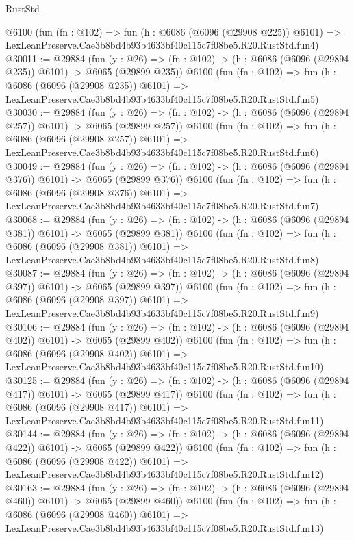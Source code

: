 \begin{lexlean}{RustStd}
\begin{coremodule}
    @6100
    (fun (fn : @102) =>
    fun (h : @6086 (@6096 (@29908 @225)) @6101) =>
    LexLeanPreserve.Cae3b8bd4b93b4633bf40c115c7f08be5.R20.RustStd.fun4)
@30011 := @29884
    (fun (y : @26) => (fn : @102) -> (h : @6086 (@6096 (@29894 @235)) @6101) -> @6065 (@29899 @235))
    @6100
    (fun (fn : @102) =>
    fun (h : @6086 (@6096 (@29908 @235)) @6101) =>
    LexLeanPreserve.Cae3b8bd4b93b4633bf40c115c7f08be5.R20.RustStd.fun5)
@30030 := @29884
    (fun (y : @26) => (fn : @102) -> (h : @6086 (@6096 (@29894 @257)) @6101) -> @6065 (@29899 @257))
    @6100
    (fun (fn : @102) =>
    fun (h : @6086 (@6096 (@29908 @257)) @6101) =>
    LexLeanPreserve.Cae3b8bd4b93b4633bf40c115c7f08be5.R20.RustStd.fun6)
@30049 := @29884
    (fun (y : @26) => (fn : @102) -> (h : @6086 (@6096 (@29894 @376)) @6101) -> @6065 (@29899 @376))
    @6100
    (fun (fn : @102) =>
    fun (h : @6086 (@6096 (@29908 @376)) @6101) =>
    LexLeanPreserve.Cae3b8bd4b93b4633bf40c115c7f08be5.R20.RustStd.fun7)
@30068 := @29884
    (fun (y : @26) => (fn : @102) -> (h : @6086 (@6096 (@29894 @381)) @6101) -> @6065 (@29899 @381))
    @6100
    (fun (fn : @102) =>
    fun (h : @6086 (@6096 (@29908 @381)) @6101) =>
    LexLeanPreserve.Cae3b8bd4b93b4633bf40c115c7f08be5.R20.RustStd.fun8)
@30087 := @29884
    (fun (y : @26) => (fn : @102) -> (h : @6086 (@6096 (@29894 @397)) @6101) -> @6065 (@29899 @397))
    @6100
    (fun (fn : @102) =>
    fun (h : @6086 (@6096 (@29908 @397)) @6101) =>
    LexLeanPreserve.Cae3b8bd4b93b4633bf40c115c7f08be5.R20.RustStd.fun9)
@30106 := @29884
    (fun (y : @26) => (fn : @102) -> (h : @6086 (@6096 (@29894 @402)) @6101) -> @6065 (@29899 @402))
    @6100
    (fun (fn : @102) =>
    fun (h : @6086 (@6096 (@29908 @402)) @6101) =>
    LexLeanPreserve.Cae3b8bd4b93b4633bf40c115c7f08be5.R20.RustStd.fun10)
@30125 := @29884
    (fun (y : @26) => (fn : @102) -> (h : @6086 (@6096 (@29894 @417)) @6101) -> @6065 (@29899 @417))
    @6100
    (fun (fn : @102) =>
    fun (h : @6086 (@6096 (@29908 @417)) @6101) =>
    LexLeanPreserve.Cae3b8bd4b93b4633bf40c115c7f08be5.R20.RustStd.fun11)
@30144 := @29884
    (fun (y : @26) => (fn : @102) -> (h : @6086 (@6096 (@29894 @422)) @6101) -> @6065 (@29899 @422))
    @6100
    (fun (fn : @102) =>
    fun (h : @6086 (@6096 (@29908 @422)) @6101) =>
    LexLeanPreserve.Cae3b8bd4b93b4633bf40c115c7f08be5.R20.RustStd.fun12)
@30163 := @29884
    (fun (y : @26) => (fn : @102) -> (h : @6086 (@6096 (@29894 @460)) @6101) -> @6065 (@29899 @460))
    @6100
    (fun (fn : @102) =>
    fun (h : @6086 (@6096 (@29908 @460)) @6101) =>
    LexLeanPreserve.Cae3b8bd4b93b4633bf40c115c7f08be5.R20.RustStd.fun13)

\end{coremodule}
\end{lexlean}
